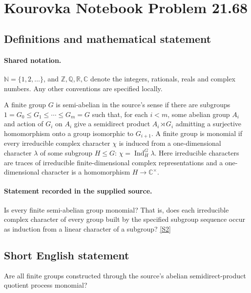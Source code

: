 \documentclass[11pt]{article}
\newcommand{\sref}[2]{\hyperlink{source:#1:#2}{[S#2]}}
\begin{document}
\section{Kourovka Notebook Problem 21.68}\label{statement}

\subsection{Definitions and mathematical statement}

\paragraph{Shared notation.}$\mathbb N=\{1,2,\ldots\}$, and $\mathbb Z,\mathbb Q,\mathbb R,\mathbb C$ denote the integers, rationals, reals and complex numbers. Any other conventions are specified locally.


A finite group $G$ is semi-abelian in the source's sense if there are subgroups
$1=G_0\leq G_1\leq\cdots\leq G_m=G$ such that, for each $i<m$, some abelian group $A_i$ and action of $G_i$ on $A_i$ give a semidirect product $A_i\rtimes G_i$ admitting a surjective homomorphism onto a group isomorphic to $G_{i+1}$. A finite group is monomial if every irreducible complex character $\chi$ is induced from a one-dimensional character $\lambda$ of some subgroup $H\leq G$: $\chi=\operatorname{Ind}_H^G\lambda$. Here irreducible characters are traces of irreducible finite-dimensional complex representations and a one-dimensional character is a homomorphism $H\to\mathbb C^\times$.
\paragraph{Statement recorded in the supplied source.}
Is every finite semi-abelian group monomial? That is, does each irreducible complex character of every group built by the specified subgroup sequence occur as induction from a linear character of a subgroup? \sref{statement}{2}
\subsection{Short English statement}
Are all finite groups constructed through the source’s abelian semidirect-product quotient process monomial?
\end{document}
